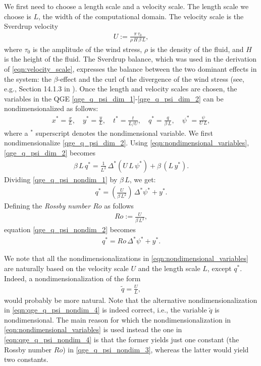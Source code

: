 We first need to choose a length scale and a velocity scale. The length scale we
choose is $L$, the width of the computational domain. The velocity scale is the
Sverdrup velocity
\begin{align}
  U := \frac{\pi \, \tau_0}{\rho \, H \, \beta \, L} , \label{eqn:velocity_scale}
\end{align}
where $\tau_0$ is the amplitude of the wind stress, $\rho$ is the density of the
fluid, and $H$ is the height of the fluid. The Sverdrup balance, which was used
in the derivation of \eqref{eqn:velocity_scale}, expresses the balance between
the two dominant effects in the system: the $\beta$-effect and the curl of the
divergence of the wind stress (see, e.g., Section 14.1.3 in \cite{Vallis06}).
Once the length and velocity scales are chosen, the variables in the QGE
\eqref{qge_q_psi_dim_1}-\eqref{qge_q_psi_dim_2} can be nondimensionalized as
follows:
\begin{align}
  x^* = \frac{x}{L}, \quad
  y^* = \frac{y}{L}, \quad
  t^* = \frac{t}{L / U}, \quad
  q^* = \frac{q}{\beta \, L}, \quad
  \psi^* = \frac{\psi}{U \, L} ,
\label{eqn:nondimensional_variables}
\end{align}
where a $^*$ superscript denotes the nondimensional variable. We first
nondimensionalize \eqref{qge_q_psi_dim_2}. Using
\eqref{eqn:nondimensional_variables}, \eqref{qge_q_psi_dim_2} becomes
\begin{align}
  \beta \, L \, q^* = \frac{1}{L^2} \, \Delta^* (U \, L \, \psi^*) + \beta \, (L \, y^*) .
  \label{qge_q_psi_nondim_1}
\end{align}
Dividing \eqref{qge_q_psi_nondim_1} by $\beta \, L$, we get:
\begin{align}
  q^* = \left( \frac{U}{\beta \, L^2} \right) \, \Delta^* \psi^* + y^* .
  \label{qge_q_psi_nondim_2}
\end{align}
Defining the \emph{Rossby number $Ro$} as follows
\begin{align}
  Ro := \frac{U}{\beta \, L^2} , \label{eqn:rossby_number}
\end{align}
equation \eqref{qge_q_psi_nondim_2} becomes
\begin{align}
  q^* = Ro \, \Delta^* \psi^* + y^* .
  \label{qge_q_psi_nondim_3}
\end{align}

We note that all the nondimensionalizations in
\eqref{eqn:nondimensional_variables} are naturally based on the velocity scale
$U$ and the length scale $L$, except $q^*$. Indeed, a nondimensionalization of
the form
\begin{align}
  {\tilde q} = \frac{U}{L},
  \label{eqn:qge_q_psi_nondim_4}
\end{align}
would probably be more natural. Note that the alternative nondimensionalization
in \eqref{eqn:qge_q_psi_nondim_4} is indeed correct, i.e., the variable ${\tilde
q}$ is nondimensional.  The main reason for which the nondimensionalization in
\eqref{eqn:nondimensional_variables} is used instead the one in
\eqref{eqn:qge_q_psi_nondim_4} is that the former yields just one constant (the
Rossby number $Ro$) in \eqref{qge_q_psi_nondim_3}, whereas the latter would
yield two constants.

